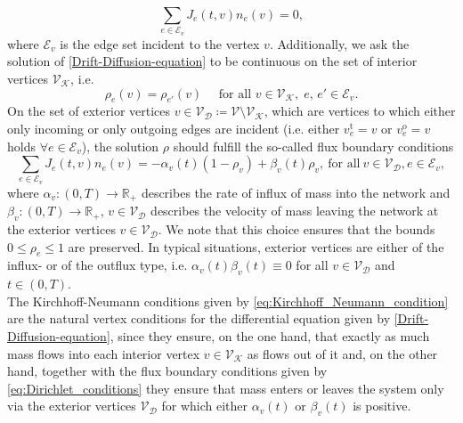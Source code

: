 \begin{equation}
    \label{eq:Kirchhoff_Neumann_condition}
    \sum_{e\in \mathcal{E}_v} J_e \left( t,v \right)  n_e  \left( v \right) =0,
\end{equation}
where $\mathcal{E}_v$ is the edge set incident to the vertex $v$. Additionally, we ask the solution of \cref{Drift-Diffusion-equation} to be continuous on the set of interior vertices $\mathcal{V}_\mathcal{K}$, i.e. 
\begin{equation}
    \label{continuous on vertices}
    \rho_e \left( v \right)  = \rho_{e'} \left( v \right)  \quad \text{ for all }v \in \mathcal{V}_\mathcal{K},\; e,\,e' \in \mathcal{E}_v.
\end{equation}
On the set of exterior vertices $v \in \mathcal{V}_\mathcal{D} \coloneqq \mathcal{V} \setminus \mathcal{V}_\mathcal{K}$, which are vertices to which either only incoming or only outgoing edges are incident (i.e. either $v^{\operatorname{t}}_{e} = v$ or $v^{\operatorname{o}}_{e} = v$ holds $\forall e \in \mathcal{E}_v$), the solution $\rho$ should fulfill the so-called flux boundary conditions
\begin{equation}
    \label{eq:Dirichlet_conditions}
    \sum_{e\in \mathcal{E}_v}J_e \left( t, v \right)  n_e  \left( v \right) =-\alpha_v \left( t \right)   \left( 1-\rho_v \right)  + \beta_v \left( t \right)  \rho_v,\ \text{for all}\ v \in \mathcal{V}_\mathcal{D}, e \in \mathcal{E}_v,
\end{equation}
where $\alpha_v \colon  \left( 0,T \right)  \to \mathbb{R}_{+}$ describes the rate of influx of mass into the network and $\beta_v \colon  \left( 0,T \right)  \to \mathbb{R}_{+}$, ${v \in \mathcal{V}_\mathcal{D}}$ describes the velocity of mass leaving the network at the exterior vertices $v \in \mathcal{V}_\mathcal{D}$. We note that this choice ensures that the bounds $0 \leq \rho_e \leq 1$ are preserved. In typical situations, exterior vertices are either of the influx- or of the outflux type, i.e. $\alpha_v \left( t \right)  \beta_v \left( t \right)  \equiv 0$ for all $v \in \mathcal{V}_\mathcal{D}$ and $t \in  \left( 0,T \right) $. \\
The Kirchhoff-Neumann conditions given by \cref{eq:Kirchhoff_Neumann_condition} are the natural vertex conditions for the differential equation given by \cref{Drift-Diffusion-equation}, since they ensure, on the one hand, that exactly as much mass flows into each interior vertex $v \in \mathcal{V}_{\mathcal{K}}$ as flows out of it and, on the other hand, together with the flux boundary conditions given by \cref{eq:Dirichlet_conditions} they ensure that mass enters or leaves the system only via the exterior vertices $\mathcal{V}_\mathcal{D}$ for which either $\alpha_v \left( t \right) $ or $\beta_v \left( t \right) $ is positive. \\

